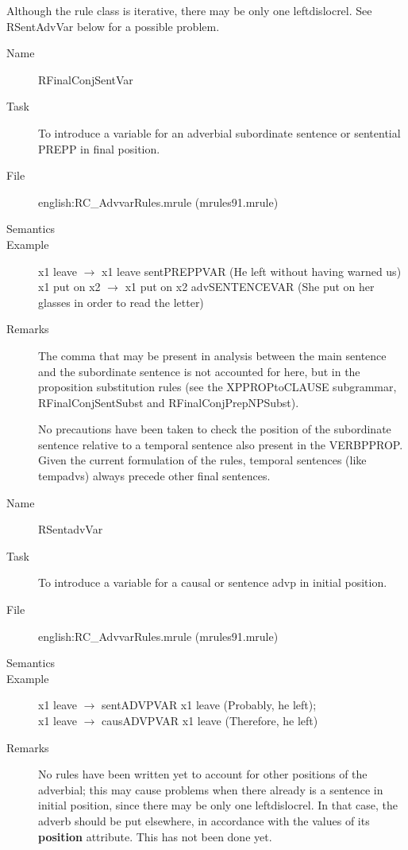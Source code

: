 \begin{description}
\begin{description}
Although the rule class is iterative, there may be only one leftdislocrel. See 
RSentAdvVar below for a possible problem.
\end{description}

\vspace{1 cm}
\begin{description}
\item[Name] RFinalConjSentVar
\item[Task] To introduce a variable for an adverbial subordinate sentence or 
sentential PREPP in final position.
\item[File] english:RC\_AdvvarRules.mrule (mrules91.mrule)
\item[Semantics]
\item[Example] x1 leave $\rightarrow$ x1 leave sentPREPPVAR (He left without 
having warned us)\\
x1 put on x2 $\rightarrow$ x1 put on x2 advSENTENCEVAR (She put on her glasses
in order to read the letter)
\item[Remarks] The comma that may be present in analysis between the main 
sentence and the subordinate sentence is not accounted for here, but 
in the proposition substitution rules (see 
the XPPROPtoCLAUSE subgrammar, RFinalConjSentSubst and RFinalConjPrepNPSubst).

No precautions have been taken to check the position of the subordinate 
sentence relative to a temporal sentence also present in the VERBPPROP. Given 
the current formulation of the rules, temporal sentences (like tempadvs) always 
precede other final sentences.
\end{description}

\vspace{1 cm}
\begin{description}
\item[Name] RSentadvVar
\item[Task] To introduce a variable for a causal or sentence advp in 
initial position. 
\item[File] english:RC\_AdvvarRules.mrule (mrules91.mrule)
\item[Semantics]
\item[Example] x1 leave $\rightarrow$ sentADVPVAR x1 leave (Probably, he left);
\\
x1 leave $\rightarrow$ causADVPVAR x1 leave (Therefore, he left)
\item[Remarks] No rules have been written yet to account for other positions 
of the adverbial; this may cause problems when there already is a sentence in 
initial position, since there may be only one leftdislocrel. 
In that case, the adverb should be put elsewhere, in 
accordance with the values of its {\bf position} attribute. This has not been 
done yet.


\end{description}
\end{description}
